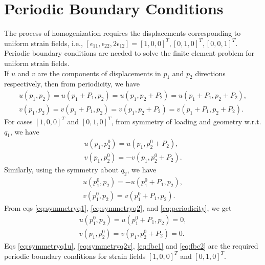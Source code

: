 \documentclass[openright,twoside]{iitkthesis}
\begin{document}
\section{Periodic Boundary Conditions}
The process of homogenization requires the displacements corresponding to uniform strain fields, i.e., $[\epsilon_{11}, \epsilon_{22}, 2\epsilon_{12}] = [1, 0, 0]^T, [0, 1, 0]^T, [0, 0, 1]^T$. Periodic boundary conditions are needed to solve the finite element problem for uniform strain fields.\\
If $u$ and $v$ are the components of displacements in $p_1$ and $p_2$ directions respectively, then from periodicity, we have
\begin{equation}
\label{eq:periodicity}
\begin{split}
u(p_1, p_2) = u(p_1+P_1, p_2) = u(p_1, p_2+P_2) = u(p_1+P_1, p_2+P_2),\\
v(p_1, p_2) = v(p_1+P_1, p_2) = v(p_1, p_2+P_2) = v(p_1+P_1, p_2+P_2).
\end{split}
\end{equation}
For cases $[1, 0, 0]^T$ and $[0, 1, 0]^T$, from symmetry of loading and geometry w.r.t. $q_1$, we have
\begin{eqnarray}
\label{eq:symmetryq1u}
u(p_1, p_2^0) = u(p_1, p_2^0+P_2),\\
\label{eq:symmetryq1}
v(p_1, p_2^0) = -v(p_1, p_2^0+P_2).
\end{eqnarray}
Similarly, using the symmetry about $q_2$, we have
\begin{eqnarray}
\label{eq:symmetryq2}
u(p_1^0, p_2) = -u(p_1^0+P_1, p_2),\\
\label{eq:symmetryq2v}
v(p_1^0, p_2) = v(p_1^0+P_1, p_2).
\end{eqnarray}
From eqs \eqref{eq:symmetryq1}, \eqref{eq:symmetryq2}, and \eqref{eq:periodicity}, we get
\begin{eqnarray}
\label{eq:fbc1}
u(p_1^0, p_2) = u(p_1^0+P_1, p_2) = 0,\\
\label{eq:fbc2}
v(p_1, p_2^0) = v(p_1, p_2^0+P_2) = 0.
\end{eqnarray}
Eqs \eqref{eq:symmetryq1u}, \eqref{eq:symmetryq2v}, \eqref{eq:fbc1} and 
\eqref{eq:fbc2} are the required periodic boundary conditions for strain fields $[1, 0, 0]^T$ and $[0, 1, 0]^T$.
\end{document}
